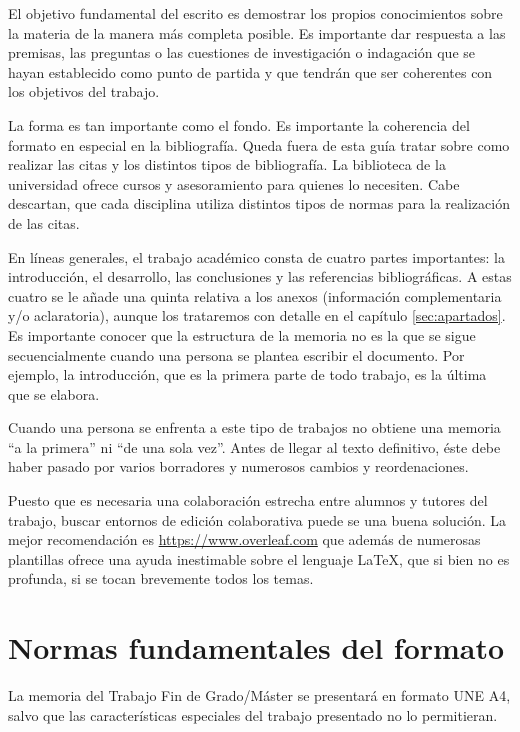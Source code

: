 El  objetivo  fundamental  del  escrito  es  demostrar  los  propios  conocimientos  sobre  la  materia de la manera más completa posible. Es importante dar respuesta  a las  premisas,  las  preguntas  o  las  cuestiones  de  investigación  o  indagación  que  se  hayan  establecido como punto de partida y que tendrán que ser coherentes con los objetivos del trabajo.

La forma es tan importante como el fondo. Es importante la coherencia del formato en especial en la bibliografía. Queda fuera de esta guía tratar sobre como realizar las citas y los distintos tipos de bibliografía. La biblioteca de la universidad ofrece cursos y asesoramiento para quienes lo necesiten. Cabe descartan, que cada disciplina utiliza distintos tipos de normas para la realización de las citas.

En líneas generales, el trabajo académico consta de cuatro partes importantes: la introducción, el desarrollo, las conclusiones y las referencias bibliográficas. A estas cuatro se le añade una quinta relativa  a  los  anexos  (información  complementaria  y/o  aclaratoria), aunque los trataremos con detalle en el capítulo \ref{sec:apartados}.  Es  importante  conocer  que  la  estructura de la memoria no  es  la  que  se  sigue  secuencialmente cuando  una  persona  se  plantea escribir el documento. Por  ejemplo,  la  introducción,  que  es  la  primera  parte  de  todo  trabajo,  es  la  última que se elabora.

Cuando  una  persona  se  enfrenta  a  este  tipo  de  trabajos no obtiene una memoria “a la primera” ni “de una sola vez”. Antes de llegar al texto definitivo, éste debe haber pasado por varios borradores y numerosos cambios y reordenaciones.

Puesto que es necesaria una colaboración estrecha entre alumnos y tutores del trabajo, buscar entornos de edición colaborativa puede se una buena solución. La mejor recomendación es \url{https://www.overleaf.com} que además de numerosas plantillas ofrece una ayuda inestimable sobre el lenguaje \LaTeX{}, que si bien no es profunda, si se tocan brevemente todos los temas.

\chapter{Normas fundamentales del formato} 
\label{sec:funda}

La memoria del Trabajo Fin de Grado/Máster se presentará en formato  UNE  A4,  salvo  que  las  características  especiales  del  trabajo  presentado  no  lo permitieran.

